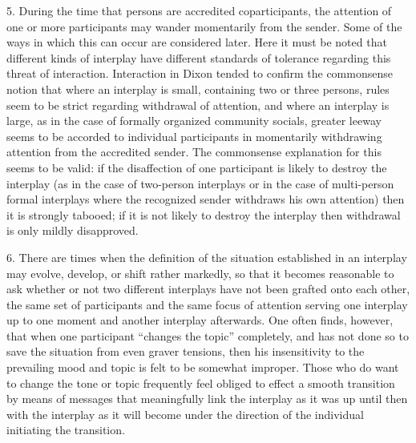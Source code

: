\documentclass[twoside,symmetric,nobib,justified]{tufte-book}
\begin{document}
5. During the time that persons are accredited coparticipants, the
attention of one or more participants may wander momentarily from the
sender. Some of the ways in which this can occur are considered later.
Here it must be noted that different kinds of interplay have different
standards of tolerance regarding this threat of interaction. Interaction
in Dixon tended to confirm the commonsense notion that where an
interplay is small, containing two or three persons, rules seem to be
strict regarding withdrawal of attention, and where an interplay is
large, as in the case of formally organized community socials, greater
leeway seems to be accorded to individual participants in momentarily
withdrawing attention from the accredited sender. The commonsense
explanation for this seems to be valid: if the disaffection of one
participant is likely to destroy the interplay (as in the case of
two-person interplays or in the case of multi-person formal interplays
where the recognized sender withdraws his own attention) then it is
strongly tabooed; if it is not likely to destroy the interplay then
withdrawal is only mildly disapproved.

6. There are times when the definition of the situation established in
an interplay may evolve, develop, or shift rather markedly, so that it
becomes reasonable to ask whether or not two different interplays have
not been grafted onto each other, the same set of participants and the
same focus of attention serving one interplay up to one moment and
another interplay afterwards. One often finds, however, that when one
participant ``changes the topic'' completely, and has not done so to
save the situation from even graver tensions, then his insensitivity to
the prevailing mood and topic is felt to be somewhat improper. Those who
do want to change the tone or topic frequently feel obliged to effect a
smooth transition by means of messages that meaningfully link the
interplay as it was up until then with the interplay as it will become
under the direction of the individual initiating the transition.
\end{document}
